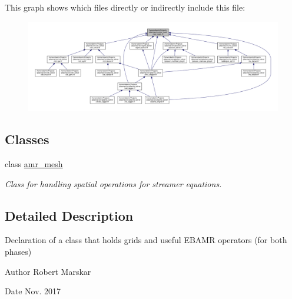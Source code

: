 This graph shows which files directly or indirectly include this file\+:\nopagebreak
\begin{figure}[H]
\begin{center}
\leavevmode
\includegraphics[width=350pt]{amr__mesh_8H__dep__incl}
\end{center}
\end{figure}
\subsection*{Classes}
\begin{DoxyCompactItemize}
\item 
class \hyperlink{classamr__mesh}{amr\+\_\+mesh}
\begin{DoxyCompactList}\small\item\em Class for handling spatial operations for streamer equations. \end{DoxyCompactList}\end{DoxyCompactItemize}


\subsection{Detailed Description}
Declaration of a class that holds grids and useful E\+B\+A\+MR operators (for both phases) 

\begin{DoxyAuthor}{Author}
Robert Marskar 
\end{DoxyAuthor}
\begin{DoxyDate}{Date}
Nov. 2017 
\end{DoxyDate}
